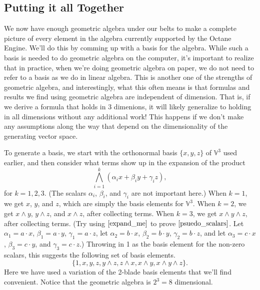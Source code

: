 \documentclass{article}
\newcommand{\V}{\mathbb{V}}
\begin{document}
\subsection{Putting it all Together}\label{all_together_section}

We now have enough geometric algebra under our belts to make a complete
picture of every element in the algebra currently supported by the Octane Engine.
We'll do this by comming up
with a basis for the algebra.  While such a basis is needed to do geometric
algebra on the computer, it's important to realize that in practice, when
we're doing geometric algebra on paper, we do not need to refer to a basis
as we do in linear algebra.  This is another one of the strengths of geometric
algebra, and interestingly, what this often means is that formulas and results we
find using geometric algebra are independent of dimension.  That is, if we
derive a formula that holds in 3 dimenions, it will likely generalize to holding
in all dimensions without any additional work!  This happens if we don't make any
assumptions along the way that depend on the dimensionality of the generating vector space.

To generate a basis, we start with the orthonormal basis $\{x,y,z\}$ of
$\V^3$ used earlier, and then consider what terms show up in the expansion
of the product
\begin{equation}\label{expand_me}
\bigwedge_{i=1}^k (\alpha_i x+\beta_i y+\gamma_i z),
\end{equation}
for $k=1,2,3$.  (The scalars $\alpha_i$, $\beta_i$,
and $\gamma_i$ are not important here.)  When $k=1$, we get $x$, $y$, and $z$, which are simply
the basis elements for $\V^3$.  When $k=2$, we get $x\wedge y$, $y\wedge z$,
and $x\wedge z$, after collecting terms.
When $k=3$, we get $x\wedge y\wedge z$, after collecting terms.  (Try using $\eqref{expand_me}$
to prove $\eqref{psuedo_scalars}$.  Let $\alpha_1=a\cdot x$, $\beta_1=a\cdot y$, $\gamma_1=a\cdot z$,
let $\alpha_2=b\cdot x$, $\beta_2=b\cdot y$, $\gamma_2=b\cdot z$, and let $\alpha_3=c\cdot x$,
$\beta_3=c\cdot y$, and $\gamma_3=c\cdot z$.)
Throwing in 1 as the basis element for the non-zero scalars, this suggests
the following set of basis elements.
\begin{equation*}
\{1,x,y,z,y\wedge z,z\wedge x,x\wedge y,x\wedge y\wedge z\}.
\end{equation*}
Here we have used a variation of the 2-blade basis elements that we'll
find convenient.  Notice that the geometric algebra is $2^3=8$ dimensional.
\end{document}
